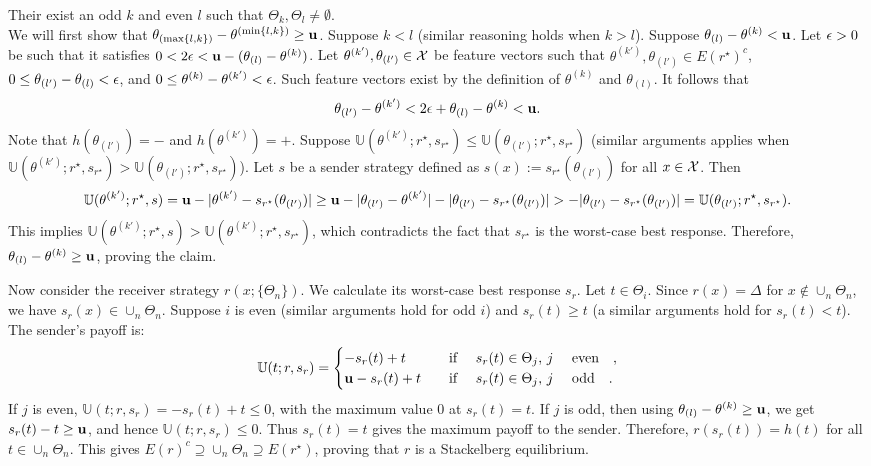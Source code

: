 \begin{apdxproof}
\begin{case}{Their exist an odd $k$ and even $l$ such that $\Theta_k, \Theta_l \neq \emptyset$.}\\
We will first show that $\theta_{(\max\{l,k\})} - \theta^{(\min\{l,k\})} \geq \mathbf{u}$. Suppose $k < l$ (similar reasoning holds when $k>l$).
Suppose $\theta_{(l)} - \theta^{(k)} < \mathbf{u}$. Let $\epsilon >0$ be such that it satisfies $0 < 2\epsilon < \mathbf{u} - (\theta_{(l)} - \theta^{(k)})$. Let $\theta^{(k')}, \theta_{(l')} \in \mathcal{X}$ be feature vectors such that $\theta^{(k')}, \theta_{(l')} \in E(r^\star)^c$,  $0 \leq \theta_{(l')} - \theta_{(l)} < \epsilon$, and $0 \leq \theta^{(k)} - \theta^{(k')} < \epsilon$.  Such feature vectors exist by the definition of $\theta^{(k)}$ and $\theta_{(l)}$. It follows that 
$$\theta_{(l')} - \theta^{(k')} < 2\epsilon + \theta_{(l)} - \theta^{(k)} < \mathbf{u}.$$ Note that $h(\theta_{(l')}) = \minus$ and $h(\theta^{(k')}) = \plus$. Suppose $\mathbb{U}(\theta^{(k')};r^\star,s_{r^\star}) \leq \mathbb{U}(\theta_{(l')};r^\star,s_{r^\star})$ (similar arguments applies when $\mathbb{U}(\theta^{(k')};r^\star,s_{r^\star}) > \mathbb{U}(\theta_{(l')};r^\star,s_{r^\star})$).
Let $s$ be a sender strategy defined as $s(x) := s_{r^\star}(\theta_{(l')})$ for all $x \in \mathcal{X}$. Then $$\mathbb{U}(\theta^{(k')}; r^\star, s) = \mathbf{u} - |\theta^{(k')} -s_{r^\star}(\theta_{(l')})| \geq   \mathbf{u} - |\theta_{(l')} - \theta^{(k')}|- |\theta_{(l')} - s_{r^\star}(\theta_{(l')})| > -|\theta_{(l')} - s_{r^\star}(\theta_{(l')})| = \mathbb{U}(\theta_{(l')};r^\star,s_{r^\star}).$$ This implies 
$\mathbb{U}(\theta^{(k')};r^\star,s) > \mathbb{U}(\theta^{(k')};r^\star,s_{r^\star})$, which contradicts the fact that $s_{r^\star}$ is the worst-case best response. Therefore, $\theta_{(l)} - \theta^{(k)} \geq \mathbf{u}$, proving the claim.

Now consider the receiver strategy $r(x; \{\Theta_n\})$. We calculate its worst-case best response $s_r$. Let $t \in \Theta_i$. Since $r(x) = \Delta$ for $x \notin \cup_n \Theta_n$, we have $s_r(x) \in \cup_n \Theta_n$. Suppose $i$ is even (similar arguments hold for odd $i$) and $s_r(t) \geq t$ (a similar arguments hold for $s_r(t) < t$). The sender's payoff is:
\[
\mathbb{U}(t; r, s_r) = 
\begin{cases}
-s_r(t) + t & \text{if } s_r(t) \in \Theta_j, \, j \text{ even}, \\
\uu - s_r(t) + t & \text{if } s_r(t) \in \Theta_j, \, j \text{ odd}.
\end{cases}
\]
If $j$ is even, $\mathbb{U}(t; r, s_r) = -s_r(t) + t \leq 0$, with the maximum value $0$ at $s_r(t) = t$. If $j$ is odd, then using $\theta_{(l)} - \theta^{(k)} \geq \mathbf{u}$, we get $s_r(t) - t \geq \mathbf{u}$, and hence $\mathbb{U}(t; r, s_r) \leq 0$. Thus $s_r(t) = t$ gives the maximum payoff to the sender. Therefore, $r(s_r(t)) = h(t)$ for all $t \in \cup_n \Theta_n$. This gives $E(r)^c \supseteq \cup_n \Theta_n \supseteq E(r^\star)$, proving that $r$ is a Stackelberg equilibrium.
\end{case}
\end{apdxproof}